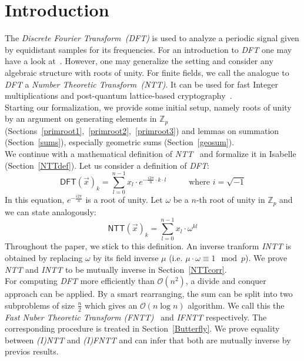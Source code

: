 \documentclass[11pt,a4paper]{article}
\begin{document}
\section{Introduction}
\indent \indent The \textit{Discrete Fourier Transform~(DFT)} is used to analyze a periodic signal given by equidistant samples for its frequencies. 
For an introduction to \textit{DFT} one may have a look at~\parencite{10.5555/1614191}.
 However, one may generalize the setting and consider any algebraic structure with roots of unity.
 For finite fields, we call the analogue to \textit{DFT} a \textit{Number Theoretic Transform~(NTT)}. It can be used for fast Integer multiplications and post-quantum lattice-based cryptography~\parencite{cryptoeprint:2016/504}.\\
\indent Starting our formalization, we provide some initial setup, namely roots of unity by an argument on generating elements in $\mathbb{Z}_p$ (Sections~\ref{primroot1},~\ref{primroot2},~\ref{primroot3}) and lemmas on summation (Section~\ref{sums}), especially geometric sums (Section~\ref{geosum}).\\
\indent We continue with a mathematical definition of \textit{NTT}~\parencite{ntt_intro} and formalize it in Isabelle (Section~\ref{NTTdef}). Let us consider a definition of \textit{DFT}:
\begin{equation*}
\mathsf{DFT}(\vec{x})_k = \sum \limits _{l=0}^{n-1} x_l \cdot e^{- \frac{i2\pi}{n}\cdot k \cdot l} \hspace{1cm} \text{ where } i = \sqrt{-1}
\end{equation*}
In this equation, $e^{- \frac{i2\pi}{n}}$ is a root of unity. Let $\omega$ be a $n$-th root of unity in $\mathbb{Z}_p$ and we can state analogously:
\begin{equation*}
\mathsf{NTT}(\vec{x})_k = \sum \limits _{l=0}^{n-1} x_l \cdot \omega^{ k l}
\end{equation*}
Throughout the paper, we stick to this definition. 
An inverse tranform \textit{INTT} is obtained by replacing $\omega$ by its field inverse $\mu$ (i.e. $\mu \cdot \omega \equiv 1  \mod p$). We prove \textit{NTT} and \textit{INTT} to be mutually inverse in Section~\ref{NTTcorr}.\\
\indent For computing \textit{DFT} more efficiently than $\mathcal{O}(n^2)$, a divide and conquer approach can be applied. By a smart rearranging, the sum can  be split into two subproblems of size $\frac{n}{2}$ which gives  an $\mathcal{O}(n \log n)$ algorithm. We call this the \textit{Fast Nuber Theoretic Transform (FNTT)}~\parencite{cryptoeprint:2016/504} and \textit{IFNTT} respectively. The corresponding procedure is treated in Section~\ref{Butterfly}. We prove equality between \textit{(I)NTT} and \textit{(I)FNTT} and can infer that both are mutually inverse by previos results.\\
\end{document}
